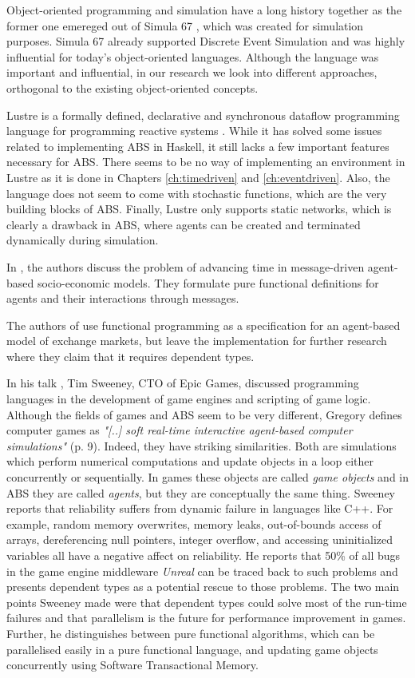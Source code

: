 Object-oriented programming and simulation have a long history together as the former one emereged out of Simula 67 \cite{dahl_birth_2002}, which was created for simulation purposes. Simula 67 already supported Discrete Event Simulation and was highly influential for today's object-oriented languages. Although the language was important and influential, in our research we look into different approaches, orthogonal to the existing object-oriented concepts.

Lustre is a formally defined, declarative and synchronous dataflow programming language for programming reactive systems \cite{halbwachs_synchronous_1991}. While it has solved some issues related to implementing ABS in Haskell, it still lacks a few important features necessary for ABS. There seems to be no way of implementing an environment in Lustre as it is done in Chapters \ref{ch:timedriven} and \ref{ch:eventdriven}. Also, the language does not seem to come with stochastic functions, which are the very building blocks of ABS. Finally, Lustre only supports static networks, which is clearly a drawback in ABS, where agents can be created and terminated dynamically during simulation.

In \cite{botta_time_2010}, the authors discuss the problem of advancing time in message-driven agent-based socio-economic models. They formulate pure functional definitions for agents and their interactions through messages.

The authors of \cite{botta_functional_2011} use functional programming as a specification for an agent-based model of exchange markets, but leave the implementation for further research where they claim that it requires dependent types.

In his talk \cite{sweeney_next_2006}, Tim Sweeney, CTO of Epic Games, discussed programming languages in the development of game engines and scripting of game logic. Although the fields of games and ABS seem to be very different, Gregory \cite{gregory_game_2018} defines computer games as \textit{"[..] soft real-time interactive agent-based computer simulations"} (p. 9). Indeed, they have striking similarities. Both are simulations which perform numerical computations and update objects in a loop either concurrently or sequentially. In games these objects are called \textit{game objects} and in ABS they are called \textit{agents}, but they are conceptually the same thing.  Sweeney reports that reliability suffers from dynamic failure in languages like C++. For example, random memory overwrites, memory leaks, out-of-bounds access of arrays, dereferencing null pointers, integer overflow, and accessing uninitialized variables all have a negative affect on reliability. He reports that 50\% of all bugs in the game engine middleware \textit{Unreal} can be traced back to such problems and presents dependent types as a potential rescue to those problems. The two main points Sweeney made were that dependent types could solve most of the run-time failures and that parallelism is the future for performance improvement in games. Further, he distinguishes between pure functional algorithms, which can be parallelised easily in a pure functional language, and updating game objects concurrently using Software Transactional Memory.
